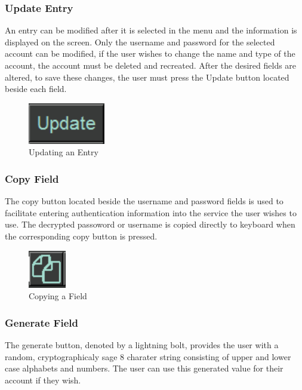\documentclass[12pt, titlepage]{article}
\begin{document}
\subsubsection{Update Entry} \label{UpdateEnt}

An entry can be modified after it is selected in the menu and the information is displayed on the screen. Only the username and password for the selected account can be modified, if the user wishes to change the name and type of the account, the account must be deleted and recreated. After the desired fields are altered, to save these changes, the user must press the Update button located beside each field.

\begin{figure}[h]
	\includegraphics[scale=0.3]{images/Update.png}
	\caption{Updating an Entry}
	\label{fig:UpEnt}
\end{figure}

\subsubsection{Copy Field} \label{CopyField}

The copy button located beside the username and password fields is used to facilitate entering authentication information into the service the user wishes to use. The decrypted passoword or username is copied directly to keyboard when the corresponding copy button is pressed.

\begin{figure}[h]
	\includegraphics[scale=0.3]{images/Copy.png}
	\caption{Copying a Field}
	\label{fig:CopF}
\end{figure}

\subsubsection{Generate Field} \label{GenField}

The generate button, denoted by a lightning bolt, provides the user with a random, cryptographicaly sage 8 charater string consisting of upper and lower case alphabets and numbers. The user can use this generated value for their account if they wish.
\end{document}
